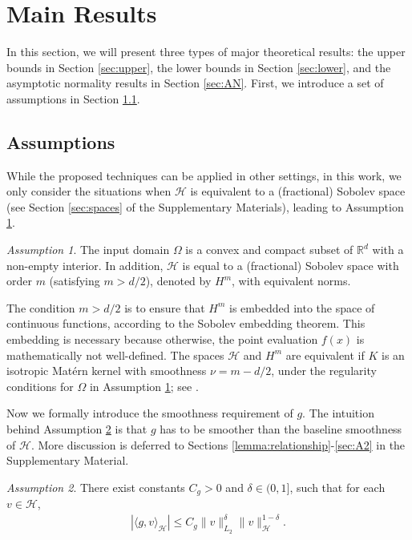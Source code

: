 \documentclass[12pt]{article}
\theoremstyle{plain}
\theoremstyle{remark}
\newtheorem{assumption}{Assumption}
\begin{document}
\section{Main Results}\label{sec:improved}

In this section, we will present three types of major theoretical results: the upper bounds in Section \ref{sec:upper}, the lower bounds in Section \ref{sec:lower}, and the asymptotic normality results in Section \ref{sec:AN}.
First, we introduce a set of assumptions in Section \ref{sec:assumptions}.

\subsection{Assumptions}\label{sec:assumptions}

While the proposed techniques can be applied in other settings, in this work, we only consider the situations when $\mathcal{H}$ is equivalent to a (fractional) Sobolev space (see Section \ref{sec:spaces} of the Supplementary Materials), leading to Assumption \ref{assum:matern}.

\begin{assumption}\label{assum:matern}
    The input domain $\Omega$ is a convex and compact subset of $\mathbb{R}^d$ with a non-empty interior.
    In addition, $\mathcal{H}$ is equal to a (fractional) Sobolev space with order $m$ (satisfying $m>d/2$), denoted by $H^m$, with equivalent norms. 
\end{assumption}

The condition $m>d/2$ is to ensure that $H^m$ is embedded into the space of continuous functions, according to the Sobolev embedding theorem. This embedding is necessary because otherwise, the point evaluation $f(x)$ is mathematically not well-defined.
The spaces $\mathcal{H}$ and $H^m$ are equivalent if $K$ is an isotropic Mat\'ern kernel with smoothness $\nu=m-d/2$, under the regularity conditions for $\Omega$ in Assumption \ref{assum:matern}; see \citep{wendland2004scattered}. 


Now we formally introduce the smoothness requirement of $g$. The intuition behind Assumption \ref{assum:f} is that $g$ has to be smoother than the baseline smoothness of $\mathcal{H}$. More discussion is deferred to Sections \ref{lemma:relationship}-\ref{sec:A2} in the Supplementary Material.



\begin{assumption}\label{assum:f}
    There exist constants $C_g>0$ and $\delta\in(0,1]$, such that for each $v\in\mathcal{H}$,
    \begin{eqnarray}\label{smoothness}
        |\langle g,v\rangle_{\mathcal{H}}|\leq C_g\|v\|^{\delta}_{L_2}\|v\|^{1-\delta}_{\mathcal{H}}.
    \end{eqnarray}
\end{assumption}
\end{document}
